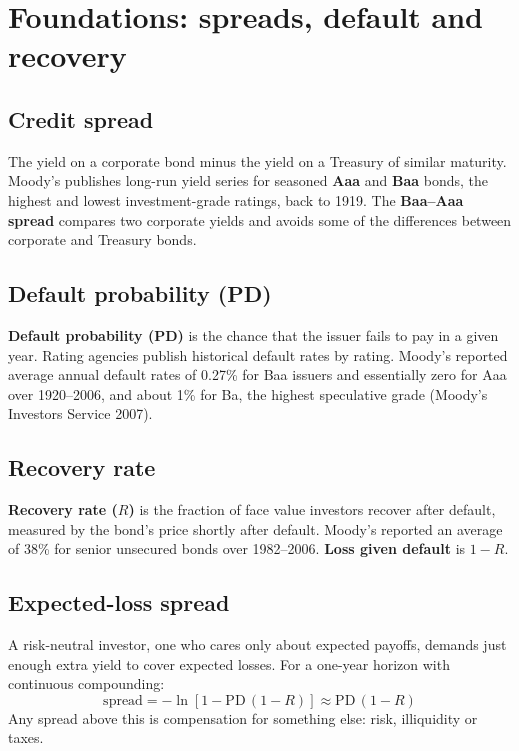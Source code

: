 \section{Foundations: spreads, default and recovery}
\label{sec:17-foundations}

\subsection{Credit spread}

The yield on a corporate bond minus the yield on a Treasury of similar maturity. Moody's publishes long-run yield series for seasoned \textbf{Aaa} and \textbf{Baa} bonds, the highest and lowest investment-grade ratings, back to 1919. The \textbf{Baa--Aaa spread} compares two corporate yields and avoids some of the differences between corporate and Treasury bonds.

\subsection{Default probability (PD)}

\textbf{Default probability (PD)} is the chance that the issuer fails to pay in a given year. Rating agencies publish historical default rates by rating. Moody's reported average annual default rates of 0.27\% for Baa issuers and essentially zero for Aaa over 1920--2006, and about 1\% for Ba, the highest speculative grade (Moody's Investors Service 2007).

\subsection{Recovery rate}

\textbf{Recovery rate ($R$)} is the fraction of face value investors recover after default, measured by the bond's price shortly after default. Moody's reported an average of 38\% for senior unsecured bonds over 1982--2006. \textbf{Loss given default} is $1 - R$.

\subsection{Expected-loss spread}

A risk-neutral investor, one who cares only about expected payoffs, demands just enough extra yield to cover expected losses. For a one-year horizon with continuous compounding:
\begin{equation}
  \text{spread} = -\ln\!\left[1 - \mathrm{PD}\,(1 - R)\right] \approx \mathrm{PD}\,(1 - R)
  \label{eq:17-el}
\end{equation}
Any spread above this is compensation for something else: risk, illiquidity or taxes.

